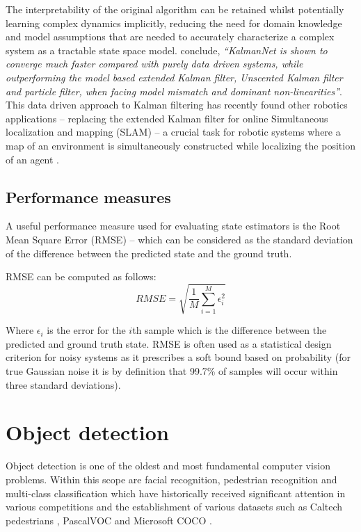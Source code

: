 \documentclass[a4paper,twoside,12pt]{report}
\begin{document}
The interpretability of the original algorithm can be retained whilst potentially learning complex dynamics implicitly, reducing the need for domain knowledge and model assumptions that are needed to accurately characterize a complex system as a tractable state space model. \cite{kalmannet} conclude, \textit{``KalmanNet is shown to converge much faster compared with purely data driven systems, while outperforming the model based extended Kalman filter, Unscented Kalman filter and particle filter, when facing model mismatch and dominant non-linearities''}. This data driven approach to Kalman filtering has recently found other robotics applications -- replacing the extended Kalman filter for online Simultaneous localization and mapping (SLAM) -- a crucial task for robotic systems where a map of an environment is simultaneously constructed while localizing the position of an agent \citep{slam}.

\subsection{Performance measures}

A useful performance measure used for evaluating state estimators is the Root Mean Square Error (RMSE) -- which can be considered as the standard deviation of the difference between the predicted state and the ground truth. \citep{kalmanperform}

RMSE can be computed as follows:
\begin{equation}
RMSE = \sqrt{\frac{1}{M}\sum^{M}_{i=1}\epsilon_{i}^{2}}
\end{equation}

Where $\epsilon_{i}$ is the error for the $i$th sample which is the difference between the predicted and ground truth state. RMSE is often used as a statistical design criterion for noisy systems as it prescribes a soft bound based on probability (for true Gaussian noise it is by definition that 99.7\% of samples will occur within three standard deviations).

\newpage
\section{Object detection}

Object detection is one of the oldest and most fundamental computer vision problems. Within this scope are facial recognition, pedestrian recognition and multi-class classification which have historically received significant attention in various competitions and the establishment of various datasets such as Caltech pedestrians \citep{peddetect}, PascalVOC \citep{vocdataset} and Microsoft COCO \citep{coco}.
\end{document}
